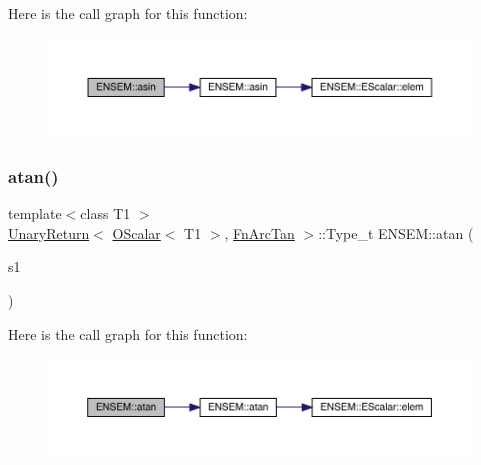 Here is the call graph for this function\+:\nopagebreak
\begin{figure}[H]
\begin{center}
\leavevmode
\includegraphics[width=350pt]{d1/d71/group__obsscalar_gac74c6933e6f290335c2ec508825d5fbb_cgraph}
\end{center}
\end{figure}
\mbox{\label{group__obsscalar_ga785cb0a8ba60f6a9a1f4494b5ac2533d}} 
\subsubsection{\texorpdfstring{atan()}{atan()}}
{\footnotesize\ttfamily template$<$class T1 $>$ \\
\mbox{\hyperlink{structENSEM_1_1UnaryReturn}{Unary\+Return}}$<$ \mbox{\hyperlink{classENSEM_1_1OScalar}{O\+Scalar}}$<$ T1 $>$, \mbox{\hyperlink{structENSEM_1_1FnArcTan}{Fn\+Arc\+Tan}} $>$\+::Type\+\_\+t E\+N\+S\+E\+M\+::atan (\begin{DoxyParamCaption}\item[{const \mbox{\hyperlink{classENSEM_1_1OScalar}{O\+Scalar}}$<$ T1 $>$ \&}]{s1 }\end{DoxyParamCaption})\hspace{0.3cm}{\ttfamily [inline]}}

Here is the call graph for this function\+:\nopagebreak
\begin{figure}[H]
\begin{center}
\leavevmode
\includegraphics[width=350pt]{d1/d71/group__obsscalar_ga785cb0a8ba60f6a9a1f4494b5ac2533d_cgraph}
\end{center}
\end{figure}
\mbox{\label{group__obsscalar_gaa28e2966b2f7ca96382766631b1e7bd1}} 
